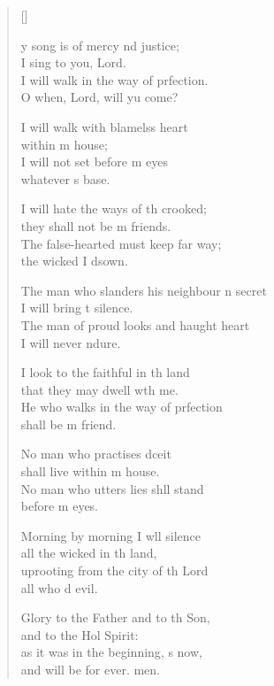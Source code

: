 \settowidth{\versewidth}{The man who slanders his neighbor in secret *}
\begin{verse}[\versewidth]
  \begin{patverse}
y song is of mercy nd justice;\Med\\
I sing to you,  Lord.\\
I will walk in the way of prfection.\Med\\
O when, Lord, will yu come?

I will walk with blamelss heart\Med\\
within m house;\\
I will not set before m eyes\Med\\
whatever \pointup{\i}s base.

I will hate the ways of th crooked;\Med\\
they shall not be m friends.\\
The false-hearted must keep far way;\Med\\
the wicked I d\pointup{\i}sown.

The man who slanders his neighbour \pointup{\i}n secret\Med\\
I will bring t silence.\\
The man of proud looks and haught heart\Med\\
I will never ndure.

I look to the faithful in th land\Med\\
that they may dwell w\pointup{\i}th me.\\
He who walks in the way of prfection\Med\\
shall be m friend.

No man who practises dceit\Med\\
shall live within m house.\\
No man who utters lies shll stand\Med\\
before m eyes.

Morning by morning I w\pointup{\i}ll silence\Med\\
all the wicked in th land,\\
uprooting from the city of th Lord\Med\\
all who d evil.

Glory to the Father and to th Son,\Med\\
and to the Hol Spirit:\\
as it was in the beginning, \pointup{\i}s now,\Med\\
and will be for ever. men.
  \end{patverse}
\end{verse}
\setlength{\leftmargini}{\defleftmargini}  %

